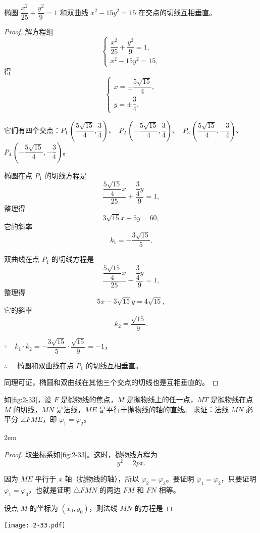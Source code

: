 \begin{example}
  椭圆 $\dfrac{x^2}{25}+\dfrac{y^2}{9}=1$ 和双曲线 $x^2-15y^2=15$ 在交点的切线互相垂直。
\end{example}
\begin{proof}
  解方程组
  \[\begin{cases}\dfrac{x^2}{25}+\dfrac{y^2}{9}=1,\\x^2-15y^2=15,\end{cases}\]
  得
  \[\begin{cases}x=\pm\dfrac{5\sqrt{15}}{4},\\y=\pm\dfrac{3}{4}.\end{cases}\]

  它们有四个交点：$P_1\,\left(\dfrac{5\sqrt{15}}{4},\dfrac{3}{4}\right)$、\ $P_2\,\left(-\dfrac{5\sqrt{15}}{4},\dfrac{3}{4}\right)$、\ $P_3\,\left(\dfrac{5\sqrt{15}}{4},-\dfrac{3}{4}\right)$、\ $P_4\,\left(-\dfrac{5\sqrt{15}}{4},-\dfrac{3}{4}\right)$。

  椭圆在点 $P_1$ 的切线方程是
  \[ \frac{\dfrac{5\sqrt{15}}{4}x}{25}+\frac{\dfrac{3}{4}y}{9}=1,\]
  整理得
  \[ 3\sqrt{15}x+5y=60,\]
  它的斜率
  \[k_1=-\frac{3\sqrt{15}}{5}.\]

  双曲线在点 $P_1$ 的切线方程是
  \[ \frac{\dfrac{5\sqrt{15}}{4}x}{25}-\frac{\dfrac{3}{4}y}{9}=1,\]
  整理得
  \[ 5x-3\sqrt{15}y=4\sqrt{15},\]
  它的斜率
  \[k_2=\frac{\sqrt{15}}{9}.\]
  
  $\because \quad k_1\cdot k_2=-\dfrac{3\sqrt{15}}{5}\cdot\dfrac{\sqrt{15}}{9}=-1$，
    
  \smallskip$\therefore \quad$ 椭圆和双曲线在点 ${P}_{1}$ 的切线互相垂直。

  同理可证，椭圆和双曲线在其他三个交点的切线也是互相垂直的。
\end{proof}

\begin{example}\label{exam:beamer}
  如\cref{fig:2-33}，设 $F$ 是抛物线的焦点，$M$ 是抛物线上的任一点，$MT$ 是抛物线在点 $M$ 的切线，$MN$ 是法线，$ME$ 是平行于抛物线的轴的直线。
  求证：法线 $MN$ 必平分 $\angle FME$，即 $\varphi_1=\varphi_2$。
\end{example}
\noindent
\begin{minipage}{0.55\linewidth}\parindent2em
\begin{proof}
  取坐标系如\cref{fig:2-33}。这时，抛物线方程为
  \[y^2=2px.\]

  因为 $ME$ 平行于 $x$ 轴（抛物线的轴），所以 $\varphi_2=\varphi_3$。要证明 $\varphi_1=\varphi_2$，只要证明 $\varphi_1=\varphi_3$，也就是证明 $\triangle FMN$ 的两边 $FM$ 和 $FN$ 相等。

设点 $M$ 的坐标为 $(x_0,y_0)$，则法线 $MN$ 的方程是
\end{proof}
\end{minipage}\hfill
\begin{minipage}{0.4\linewidth}\centering
  \begin{figurehere}
    \texttt{[image: 2-33.pdf]}
    \caption{}\label{fig:2-33}
  \end{figurehere}
\end{minipage}


